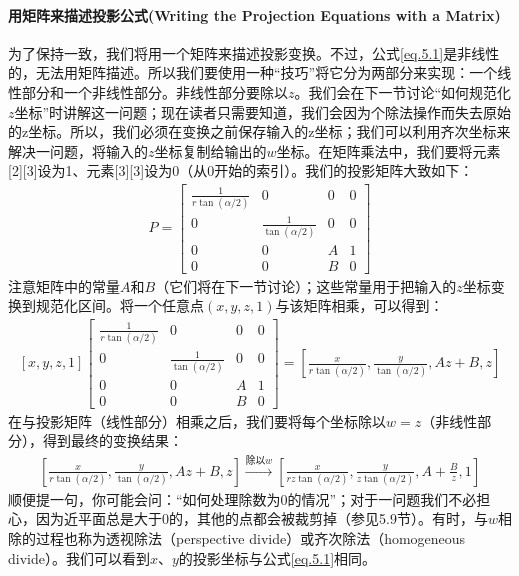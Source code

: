 \documentclass[11pt,a4paper,oldfontcommands]{memoir}
\begin{document}
{\paragraph{用矩阵来描述投影公式(Writing the Projection Equations with a Matrix)}
\begin{flushleft}
为了保持一致，我们将用一个矩阵来描述投影变换。不过，公式\ref{eq.5.1}是非线性的，无法用矩阵描述。所以我们要使用一种“技巧”将它分为两部分来实现：一个线性部分和一个非线性部分。非线性部分要除以$z$。我们会在下一节讨论“如何规范化$z$坐标”时讲解这一问题；现在读者只需要知道，我们会因为个除法操作而失去原始的z坐标。所以，我们必须在变换之前保存输入的z坐标；我们可以利用齐次坐标来解决一问题，将输入的$z$坐标复制给输出的$w$坐标。在矩阵乘法中，我们要将元素[2][3]设为1、元素[3][3]设为0（从0开始的索引）。我们的投影矩阵大致如下：
\begin{align*}
P=\begin{bmatrix}
\frac{1}{r\tan(\alpha/2)} & 0 & 0 & 0\\
0 & \frac{1}{\tan(\alpha/2)} & 0 & 0\\
0 & 0 & A & 1\\
0 & 0 & B & 0
\end{bmatrix}
\end{align*}
注意矩阵中的常量$A$和$B$（它们将在下一节讨论）；这些常量用于把输入的$z$坐标变换到规范化区间。将一个任意点$(x,y,z,1)$与该矩阵相乘，可以得到：
\begin{align*}\tag{eq.5.2}\label{eq.5.2}
[x,y,z,1]\begin{bmatrix}
\frac{1}{r\tan(\alpha/2)} & 0 & 0 & 0\\
0 & \frac{1}{\tan(\alpha/2)} & 0 & 0\\
0 & 0 & A & 1\\
0 & 0 & B & 0
\end{bmatrix}=\left[ \frac{x}{r\tan(\alpha/2)},\frac{y}{\tan(\alpha/2)},Az+B,z\right]
\end{align*}
在与投影矩阵（线性部分）相乘之后，我们要将每个坐标除以$w = z$（非线性部分），得到最终的变换结果：
\begin{align*}\tag{eq.5.3}\label{eq.5.3}
\left[ \frac{x}{r\tan(\alpha/2)},\frac{y}{\tan(\alpha/2)},Az+B,z\right]
\xrightarrow[]{\text{除以$w$}}
\left[ \frac{x}{rz\tan(\alpha/2)},\frac{y}{z\tan(\alpha/2)},A+\frac{B}{z},1\right]
\end{align*}
顺便提一句，你可能会问：“如何处理除数为0的情况”；对于一问题我们不必担心，因为近平面总是大于0的，其他的点都会被裁剪掉（参见5.9节）。有时，与$w$相除的过程也称为透视除法（perspective divide）或齐次除法（homogeneous divide）。我们可以看到$x$、$y$的投影坐标与公式\ref{eq.5.1}相同。
\end{flushleft}

}
\end{document}
